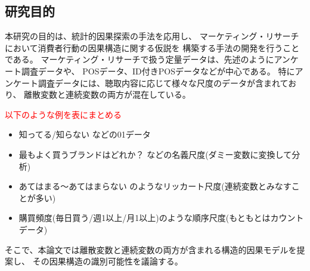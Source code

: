 
\subsection{研究目的}

本研究の目的は、統計的因果探索の手法を応用し、
マーケティング・リサーチにおいて消費者行動の因果構造に関する仮説を
構築する手法の開発を行うことである。
マーケティング・リサーチで扱う定量データは、先述のようにアンケート調査データや、
POSデータ、ID付きPOSデータなどが中心である。
特にアンケート調査データには、聴取内容に応じて様々な尺度のデータが含まれており、
離散変数と連続変数の両方が混在している。

\textcolor{red}{以下のような例を表にまとめる}

\begin{itemize}
  \item 知ってる/知らない などの01データ
  \item 最もよく買うブランドはどれか？ などの名義尺度(ダミー変数に変換して分析)
  \item あてはまる〜あてはまらない のようなリッカート尺度(連続変数とみなすことが多い)
  \item 購買頻度(毎日買う/週1以上/月1以上)のような順序尺度(もともとはカウントデータ)
\end{itemize}

そこで、本論文では離散変数と連続変数の両方が含まれる構造的因果モデルを提案し、
その因果構造の識別可能性を議論する。
